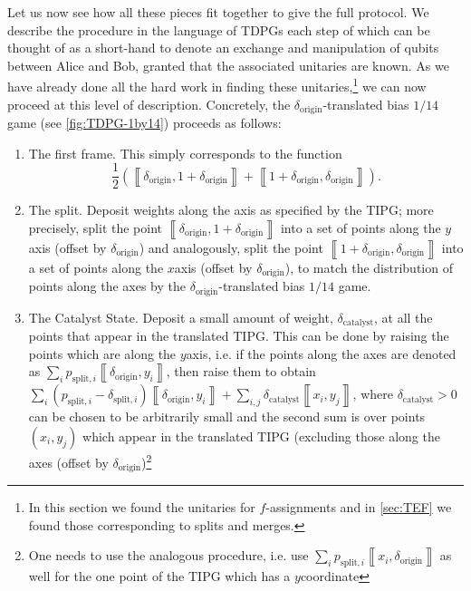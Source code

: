 \documentclass{article}
\newcommand{\atul}[1]{#1} %
\newcommand{\dorigin}[0]{\delta_{\textrm{origin}}} %
\begin{document}
Let us now see how all these pieces fit together
to give the full protocol. We describe the procedure
in the language of TDPGs each step of which can be thought of as a short-hand to denote
an exchange and manipulation of qubits between Alice and Bob, granted that
the associated unitaries are known. As we have already done all the
hard work in finding these unitaries,\footnote{In this section we found the unitaries for $f$-assignments and in \cref{sec:TEF} we found those corresponding to splits and merges.} we can now proceed at this level of description. Concretely, the $\dorigin$-translated bias $1/14$ game (see  \cref{fig:TDPG-1by14}) \atul{proceeds} as follows:
\begin{enumerate}
  \item The first frame. This simply corresponds to the function $$\frac{1}{2}\left(\left\llbracket \dorigin,1 + \dorigin \right\rrbracket +\left\llbracket 1 + \dorigin,\dorigin \right\rrbracket \right).$$
  \item The split. \atul{Deposit weights along the axis as specified by the TIPG; more precisely, split the point $\left\llbracket \dorigin,1 + \dorigin\right\rrbracket $
          into a set of points along the $y$\textendash axis (offset by $\dorigin$) and analogously,
          split the point $\left\llbracket 1 + \dorigin ,\dorigin\right\rrbracket $ into a set of points
          along the $x$\textendash axis (offset by $\dorigin$), to match the distribution of points
          along the axes by the $\dorigin$-translated bias $1/14$ game.}
  \item The Catalyst State. \atul{Deposit a small amount of weight, $\delta_{\text{catalyst}}$,
        at all the points that appear in the translated TIPG. This can be done
        by raising  the points which are
        along the $y$\textendash axis, i.e. if the points along the axes
        are denoted as $\sum_{i}p_{\text{split},i}\left\llbracket \dorigin,y_{i}\right\rrbracket $,
        then raise them to obtain $\sum_{i}(p_{\text{split},i}-\delta_{\text{split},i})\left\llbracket \dorigin,y_{i}\right\rrbracket +\sum_{i,j}\delta_{\text{catalyst}}\left\llbracket x_{i},y_{j}\right\rrbracket $,
        where $\delta_{\text{catalyst}}>0$ can be chosen to be arbitrarily
        small and
        the second sum is over points $(x_{i},y_{j})$ which appear in the
        translated TIPG (excluding those along the axes (offset by $\dorigin$)\footnote{One needs to use the analogous procedure, i.e. use $\sum_{i}p_{\text{split},i}\left\llbracket x_{i},\dorigin\right\rrbracket $
        as well for the one point of the TIPG which has a $y$\textendash coordinate
}}
\end{enumerate}
\end{document}

